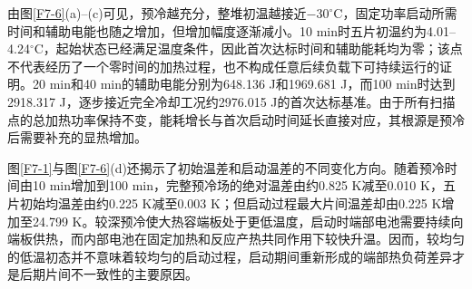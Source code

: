 \documentclass[bwprint]{gmcmthesis}
\numberwithin{figure}{section}
\begin{document}
\begin{table}[htbp]
    \centering
    \caption{不同预冷时间下固定恒功率启动的代表性结果}
    \vspace{0.3cm}
    \label{tab:q4:scan}
    \renewcommand{\arraystretch}{1.5}
\end{table}

由图\ref{F7-6}(a)--(c)可见，预冷越充分，整堆初温越接近\(-30^\circ\mathrm C\)，固定功率启动所需时间和辅助电能也随之增加，但增加幅度逐渐减小。10 min时五片初温约为4.01--4.24\(^\circ\mathrm C\)，起始状态已经满足温度条件，因此首次达标时间和辅助能耗均为零；该点不代表经历了一个零时间的加热过程，也不构成任意后续负载下可持续运行的证明。20 min和40 min的辅助电能分别为648.136 J和1969.681 J，而100 min时达到2918.317 J，逐步接近完全冷却工况约2976.015 J的首次达标基准。由于所有扫描点的总加热功率保持不变，能耗增长与首次启动时间延长直接对应，其根源是预冷后需要补充的显热增加。

图\ref{F7-1}与图\ref{F7-6}(d)还揭示了初始温差和启动温差的不同变化方向。随着预冷时间由10 min增加到100 min，完整预冷场的绝对温差由约0.825 K减至0.010 K，五片初始均温差由约0.225 K减至0.003 K；但启动过程最大片间温差却由0.225 K增加至24.799 K。较深预冷使大热容端板处于更低温度，启动时端部电池需要持续向端板供热，而内部电池在固定加热和反应产热共同作用下较快升温。因而，较均匀的低温初态并不意味着较均匀的启动过程，启动期间重新形成的端部热负荷差异才是后期片间不一致性的主要原因。
\end{document}
